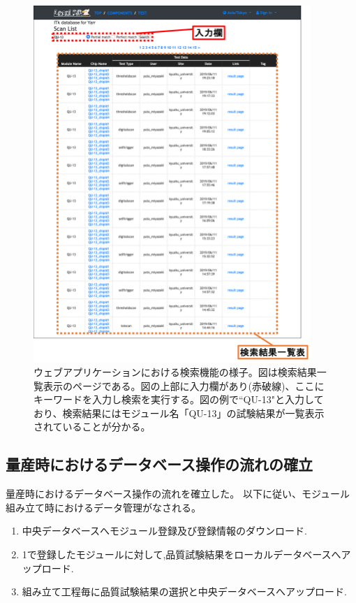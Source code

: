 \begin{figure}[bpt]\centering
\includegraphics[width=10.5cm]{./webapp_search_function.png}
\caption[ウェブアプリケーションにおける検索機能の様子]{ウェブアプリケーションにおける検索機能の様子。図は検索結果一覧表示のページである。図の上部に入力欄があり(赤破線)、ここにキーワードを入力し検索を実行する。図の例で``QU-13"と入力しており、検索結果にはモジュール名「QU-13」の試験結果が一覧表示されていることが分かる。}
\label{webapp_search_function}
\end{figure}


\clearpage
\subsection{量産時におけるデータベース操作の流れの確立}
量産時におけるデータベース操作の流れを確立した。
以下に従い、モジュール組み立て時におけるデータ管理がなされる。
\begin{enumerate}
  \item 中央データベースへモジュール登録及び登録情報のダウンロード.
  \item 1で登録したモジュールに対して,品質試験結果をローカルデータベースへアップロード.
  \item 組み立て工程毎に品質試験結果の選択と中央データベースへアップロード.
\end{enumerate}

